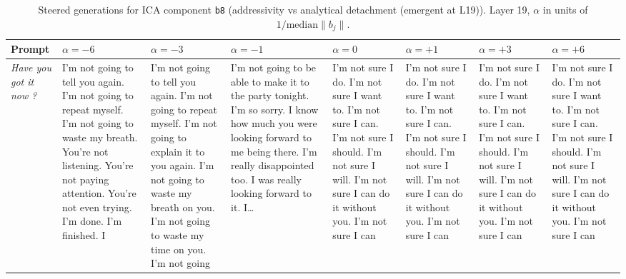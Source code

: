 \begin{table}[t]
\centering\scriptsize
\caption{Steered generations for ICA component \texttt{b8} (addressivity vs analytical detachment (emergent at L19)). Layer 19, $\alpha$ in units of $1/\mathrm{median}\|b_j\|$.}
\label{tab:steer_b8}
\begin{tabularx}{\textwidth}{p{} X X X X X X X}
\toprule
Prompt & $\alpha=-6$ & $\alpha=-3$ & $\alpha=-1$ & $\alpha=0$ & $\alpha=+1$ & $\alpha=+3$ & $\alpha=+6$ \\
\midrule
\textit{Have you got it now ?} & I'm not going to tell you again. I'm not going to repeat myself. I'm not going to waste my breath. You're not listening. You're not paying attention. You're not even trying. I'm done. I'm finished. I & I'm not going to tell you again. I'm not going to repeat myself. I'm not going to explain it to you again. I'm not going to waste my breath on you. I'm not going to waste my time on you. I'm not going & I'm not going to be able to make it to the party tonight. I'm so sorry. I know how much you were looking forward to me being there. I'm really disappointed too. I was really looking forward to it. I… & I'm not sure I do. I'm not sure I want to. I'm not sure I can. I'm not sure I should. I'm not sure I will. I'm not sure I can do it without you. I'm not sure I can & I'm not sure I do. I'm not sure I want to. I'm not sure I can. I'm not sure I should. I'm not sure I will. I'm not sure I can do it without you. I'm not sure I can & I'm not sure I do. I'm not sure I want to. I'm not sure I can. I'm not sure I should. I'm not sure I will. I'm not sure I can do it without you. I'm not sure I can & I'm not sure I do. I'm not sure I want to. I'm not sure I can. I'm not sure I should. I'm not sure I will. I'm not sure I can do it without you. I'm not sure I can \\

\end{tabularx}
\end{table}

